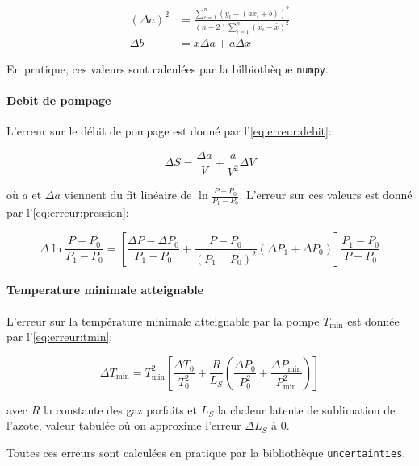 \begin{equation}
    \label{eq:erreur:fit}
    \begin{aligned}
        (\Delta a)^2 &= \frac{\sum_{i=1}^{n}(y_i - (a x_i + b))^2}{(n-2) \sum_{i=1}^{n}(x_i - \bar{x})^2}\\
        \Delta b &= \bar{x} \Delta a + a \Delta \bar{x}
    \end{aligned}
\end{equation}

En pratique, ces valeurs sont calculées par la bilbiothèque \texttt{numpy}.

\paragraph*{Debit de pompage}
L'erreur sur le débit de pompage est donné par l'\autoref{eq:erreur:debit}:

\begin{equation}
    \Delta S = \frac{\Delta a}{V} + \frac{a}{V^2} \Delta V
    \label{eq:erreur:debit}
\end{equation}

où \(a\) et \(\Delta a\) viennent du fit linéaire de \(\ln{\frac{P - P_0}{P_1 - P_0}}\). L'erreur sur ces valeurs est donné par l'\autoref{eq:erreur:pression}:

\begin{equation}
    \Delta \ln{\frac{P - P_0}{P_1 - P_0}} = \left[\frac{\Delta P - \Delta P_0}{P_1 - P_0} + \frac{P - P_0}{(P_1 - P_0)^2}(\Delta P_1 + \Delta P_0)\right] \frac{P_1 - P_0}{P - P_0}
    \label{eq:erreur:pression}
\end{equation}


\paragraph*{Temperature minimale atteignable}
L'erreur sur la température minimale atteignable par la pompe \(T_\textrm{min}\) est donnée par l'\autoref{eq:erreur:tmin}:

\begin{equation}
    \Delta T_\textrm{min} = T_\textrm{min}^2\left[\frac{\Delta T_0}{T_0^2} + \frac{R}{L_S}\left(\frac{\Delta P_0}{P_0^2} + \frac{\Delta P_\textrm{min}}{P_\textrm{min}^2}\right)\right]
    \label{eq:erreur:tmin}
\end{equation}

avec \(R\) la constante des gaz parfaits et \(L_S\) la chaleur latente de sublimation de l'azote, valeur tabulée où on approxime l'erreur \(\Delta L_S\) à 0.

Toutes ces erreurs sont calculées en pratique par la bibliothèque \texttt{uncertainties}.
